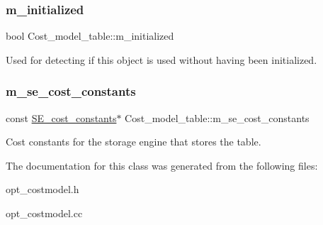 \subsubsection{\texorpdfstring{m\+\_\+initialized}{m\_initialized}}
{\footnotesize\ttfamily bool Cost\+\_\+model\+\_\+table\+::m\+\_\+initialized\hspace{0.3cm}{\ttfamily [protected]}}

Used for detecting if this object is used without having been initialized. \mbox{\label{classCost__model__table_a4afd938f845748bc0ba0e1dead1f2221}} 
\subsubsection{\texorpdfstring{m\+\_\+se\+\_\+cost\+\_\+constants}{m\_se\_cost\_constants}}
{\footnotesize\ttfamily const \mbox{\hyperlink{classSE__cost__constants}{S\+E\+\_\+cost\+\_\+constants}}$\ast$ Cost\+\_\+model\+\_\+table\+::m\+\_\+se\+\_\+cost\+\_\+constants\hspace{0.3cm}{\ttfamily [protected]}}

Cost constants for the storage engine that stores the table. 

The documentation for this class was generated from the following files\+:\begin{DoxyCompactItemize}
\item 
opt\+\_\+costmodel.\+h\item 
opt\+\_\+costmodel.\+cc\end{DoxyCompactItemize}
